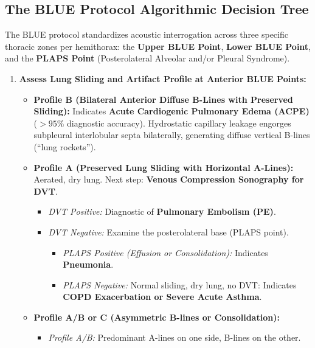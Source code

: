 \documentclass[11pt,a4paper]{article}
\begin{document}
\subsection{The BLUE Protocol Algorithmic Decision Tree}
The BLUE protocol standardizes acoustic interrogation across three specific thoracic zones per hemithorax: the \textbf{Upper BLUE Point}, \textbf{Lower BLUE Point}, and the \textbf{PLAPS Point} (Posterolateral Alveolar and/or Pleural Syndrome). 

\begin{protocolbox}
\begin{enumerate}[leftmargin=1.5em]
    \item \textbf{Assess Lung Sliding and Artifact Profile at Anterior BLUE Points:}
    \begin{itemize}
        \item \textbf{Profile B (Bilateral Anterior Diffuse B-Lines with Preserved Sliding):}
        Indicates \textbf{Acute Cardiogenic Pulmonary Edema (ACPE)} ($> 95\%$ diagnostic accuracy). Hydrostatic capillary leakage engorges subpleural interlobular septa bilaterally, generating diffuse vertical B-lines (``lung rockets'').
        \item \textbf{Profile A (Preserved Lung Sliding with Horizontal A-Lines):}
        Aerated, dry lung. Next step: \textbf{Venous Compression Sonography for DVT}.
        \begin{itemize}
            \item \textit{DVT Positive:} Diagnostic of \textbf{Pulmonary Embolism (PE)}.
            \item \textit{DVT Negative:} Examine the posterolateral base (PLAPS point).
            \begin{itemize}
                \item \textit{PLAPS Positive (Effusion or Consolidation):} Indicates \textbf{Pneumonia}.
                \item \textit{PLAPS Negative:} Normal sliding, dry lung, no DVT: Indicates \textbf{COPD Exacerbation or Severe Acute Asthma}.
            \end{itemize}
        \end{itemize}
        \item \textbf{Profile A/B or C (Asymmetric B-lines or Consolidation):}
        \begin{itemize}
            \item \textit{Profile A/B:} Predominant A-lines on one side, B-lines on the other.

\end{itemize}
\end{itemize}
\end{enumerate}
\end{protocolbox}
\end{document}
